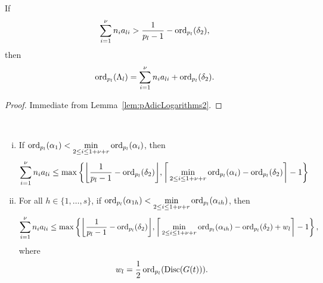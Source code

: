 \begin{lemma} \label{lem:Lambda}
If 
\[\sum_{i = 1}^{\nu} n_{i}a_{li} > \frac{1}{p_l-1} - \operatorname{ord}_{p_l}(\delta_2),\]
then
\[\operatorname{ord}_{p_l}(\Lambda_l) = \sum_{i = 1}^{\nu} n_{i}a_{li} + \operatorname{ord}_{p_l}(\delta_2).\]
\end{lemma}

\begin{proof}
Immediate from Lemma~\ref{lem:pAdicLogarithms2}.
\end{proof}

\begin{lemma} \label{Lem:specialcase} \
\begin{enumerate}[(i)]
\item If $\operatorname{ord}_{p_l}(\alpha_1) < \displaystyle \min_{2 \leq i \leq 1+\nu+r} \operatorname{ord}_{p_l}(\alpha_i)$, then
\[\sum_{i = 1}^{\nu} n_i a_{li} \leq \max \left\{ \bigg\lfloor{\frac{1}{p_l-1} - \operatorname{ord}_{p_l}(\delta_2)}\bigg\rfloor,  \bigg \lceil\displaystyle \min_{2 \leq i \leq 1+\nu+r} \operatorname{ord}_{p_l}(\alpha_{i}) - \operatorname{ord}_{p_l}(\delta_2) \bigg \rceil - 1 \right\}\]
\item For all $h \in \{1, \dots, s\}$, if $\operatorname{ord}_{p_l}(\alpha_{1h}) < \displaystyle \min_{2 \leq i \leq 1+\nu+r} \operatorname{ord}_{p_l}(\alpha_{ih})$, then
\[\sum_{i = 1}^{\nu} n_i a_{li} \leq \max \left\{ \bigg\lfloor{\frac{1}{p_l-1} - \operatorname{ord}_{p_l}(\delta_2)}\bigg\rfloor, \bigg \lceil \displaystyle \min_{2 \leq i \leq 1+\nu+r} \operatorname{ord}_{p_l}(\alpha_{ih})- \operatorname{ord}_{p_l}(\delta_2) + w_l \bigg \rceil - 1\right\},\]
where 
\[w_l = \frac{1}{2}\operatorname{ord}_{p_l}(\text{Disc}(G(t))).\]
\end{enumerate}
\end{lemma}

